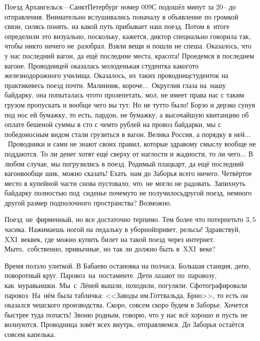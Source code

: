 Поезд Архангельск\thinspace\nobreakdash---\thinspace Санкт\sdash Петербург номер 009С подошёл минут за 20\thinspace\nobreakdash-- до отправления. Внимательно вслушивались поначалу в объявление по громкой связи, силясь понять, на какой путь прибывает наш поезд. Потом в~итоге определили это визуально, поскольку, кажется, диктор специально говорила так, чтобы никто ничего не~разобрал. Взяли вещи и пошли не спеша. Оказалось, что у нас последний вагон, да ещё последние места, красота! Проедемся в последнем вагоне. Проводницей оказалась молоденькая студентка какого\sdash то железнодорожного училища. Оказалось, их таких проводниц\sdash студенток на практике\mdash весь поезд почти. Малинник, короче$\ldots$~Округлив глаза на~нашу байдарку, она попыталась что\sdash то пролепетать, мол, не имеет права нас с таким грузом пропускать и вообще чего вы тут. Но не тут\sdash то было! Борзо и дерзко сунув под нос ей бумажку, то есть, пардон, не бумажку, а высочайшую квитанцию об оплате бешеной суммы в сто с чем\sdash то рублей на провоз байдарки, мы с победоносным видом стали грузиться в вагон. Велика Россия, а порядку в ней$\ldots$~Проводники и сами не знают своих правил, которые здравому смыслу вообще не поддаются. То ли денег хотят ещё сверху от наглости и жадности, то ли чего$\ldots$
\newpage
В любом случае, мы погрузились в поезд. Родимый плацкарт, да ещё последний вагон\mdash вообще шик, можно сказать! Ехать~нам до Заборья всего ничего. Четвёртое место в купейной части снова пустовало, что~не могло не радовать. Запихнуть байдарку полностью под~сиденье почему\sdash то не получилось\mdash другой поезд, немного другой размер подполочного пространства? Возможно. 

Поезд~не~фирменный, но все достаточно терпимо. Тем более что потерпеть\sdash то $3,5$ часика. Нажимаешь ногой на педальку в уборной\mdash привет, рельсы! Здравствуй, XXI~век\mdash век, где можно купить билет на такой поезд через интернет. Мы\sdash то,~собственно, привычные, но так ли должно быть в~XXI~веке?

Время ползло улиткой. В Бабаево остановка на полчаса. Большая станция, депо, поворотный круг. Паровоз~на~постаменте. Дети лазают по~паровозу, как~муравьишки. Мы~с~Лёней вышли, походили, погуляли. Сфотографировали паровоз. На~нём была табличка: <<Заводы им.\thinspace Готтвальда, Брно>>, то есть он оказался чешского производства. Скоро, совсем скоро будем в Заборье. Хочется быстрее туда попасть! Звоню родным, говорю, что у нас всё хорошо и пусть не волнуются. Проводница зовёт всех внутрь, отправляемся. До Заборья остаётся совсем капелька.


